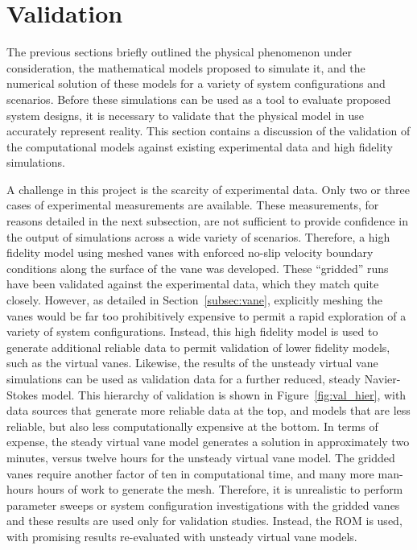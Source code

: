 
\section{Validation}
\label{sec:validation}

%
%
%

%
%

The previous sections briefly outlined the physical phenomenon under
consideration, the mathematical models proposed to simulate it,
and the numerical solution of these models for a variety of system 
configurations and scenarios. Before these simulations can be used 
as a tool to evaluate proposed system designs, it is necessary to
validate that the physical model in use accurately represent
reality. This section contains a discussion of the validation of the
computational models against existing experimental data and high
fidelity simulations. 

A challenge in this project is the scarcity of experimental data. Only
two or three cases of experimental measurements are available. These
measurements, for reasons detailed in the next subsection, are not
sufficient to provide confidence in the output of simulations across a
wide variety  of scenarios. Therefore, a high fidelity model using 
meshed vanes with enforced no-slip velocity boundary conditions along
the surface of the vane was developed. These ``gridded'' runs have
been validated against the experimental data, which they match quite
closely. However, as detailed in Section~\ref{subsec:vane}, 
explicitly meshing the vanes would be far too 
prohibitively expensive to permit a rapid exploration of a variety of
system configurations. Instead, this high fidelity model is used 
to generate additional reliable data to permit validation of lower
fidelity models, such as the virtual vanes. Likewise, the results of the
unsteady virtual vane simulations can be used as validation data for a
further reduced, steady Navier-Stokes model. This hierarchy of
validation is shown in Figure~\ref{fig:val_hier}, with data sources that
generate more reliable data at the top, and models that are less
reliable, but also less computationally expensive at the bottom. In
terms of expense, the steady virtual vane model generates a solution in
approximately two minutes, versus twelve hours for the unsteady virtual
vane model. The gridded vanes require another factor of ten in
computational time, and many more man-hours hours of work to generate
the mesh. Therefore, it is unrealistic to perform parameter sweeps or
system configuration investigations with the gridded vanes and these
results are used only for validation studies. Instead, the
ROM is used, with promising results re-evaluated with unsteady virtual
vane models. %

